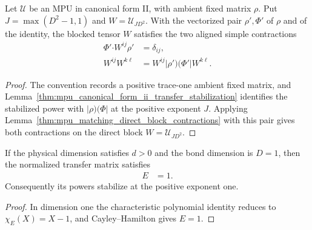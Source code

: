 \begin{lemma}
    \label{thm:mpu_reduced_cfii_forced_block_simple_contractions}
    \leanok
    Let $\mathcal U$ be an MPU in canonical form II, with ambient fixed
    matrix $\rho$. Put $J=\max(D^2-1,1)$ and $W=\mathcal U_{JD^2}$. With
    the vectorized pair $\rho',\Phi'$ of $\rho$ and of the identity, the
    blocked tensor $W$ satisfies the two aligned simple contractions
    \begin{align}
        \Phi'\mathbin{\boldsymbol\cdot}W^{ij}\rho'
         & =\delta_{ij},                              \\
        W^{ij}W^{k\ell}
         & =W^{ij}\lvert\rho')(\Phi'\rvert W^{k\ell}.
    \end{align}
\end{lemma}

\begin{proof}\leanok
    The convention records a positive trace-one ambient fixed matrix, and
    Lemma~\ref{thm:mpu_canonical_form_ii_transfer_stabilization} identifies
    the stabilized power with $\lvert\rho)(\Phi\rvert$ at the positive exponent
    $J$. Applying Lemma~\ref{thm:mpu_matching_direct_block_contractions} with
    this pair gives both contractions on the direct block
    $W=\mathcal U_{JD^2}$.
\end{proof}

\begin{lemma}
    \label{thm:mpu_normalized_transfer_fin_one}
    \leanok
    If the physical dimension satisfies $d>0$ and the bond dimension is $D=1$,
    then the normalized transfer matrix satisfies
    \begin{align}
        E & =1.
    \end{align}
    Consequently its powers stabilize at the positive exponent one.
\end{lemma}

\begin{proof}\leanok
    In dimension one the characteristic polynomial identity reduces to
    $\chi_E(X)=X-1$, and Cayley--Hamilton gives $E=1$.
\end{proof}

